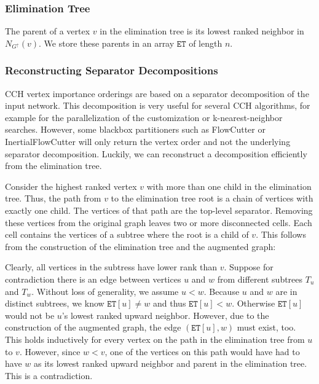 \documentclass[a4paper, english, cleveref]{lipics-v2021}
\newcommand*{\gchu}{G^{\uparrow}}
\begin{document}
\subsubsection{Elimination Tree}

The parent of a vertex $v$ in the elimination tree is its lowest ranked neighbor in $N_{\gchu}(v)$.
We store these parents in an array $\mathtt{ET}$ of length $n$.

\subsubsection{Reconstructing Separator Decompositions}
\label{sec:reconstruct_sep_tree}

CCH vertex importance orderings are based on a separator decomposition of the input network.
This decomposition is very useful for several CCH algorithms, for example for the parallelization of the customization or k-nearest-neighbor searches.
However, some blackbox partitioners such as FlowCutter or InertialFlowCutter will only return the vertex order and not the underlying separator decomposition.
Luckily, we can reconstruct a decomposition efficiently from the elimination tree.

Consider the highest ranked vertex $v$ with more than one child in the elimination tree.
Thus, the path from $v$ to the elimination tree root is a chain of vertices with exactly one child.
The vertices of that path are the top-level separator.
Removing these vertices from the original graph leaves two or more disconnected cells.
Each cell contains the vertices of a subtree where the root is a child of $v$.
This follows from the construction of the elimination tree and the augmented graph:

Clearly, all vertices in the subtress have lower rank than $v$.
Suppose for contradiction there is an edge between vertices $u$ and $w$ from different subtrees $T_u$ and $T_w$.
Without loss of generality, we assume $u < w$.
Because $u$ and $w$ are in distinct subtrees, we know $\mathtt{ET}[u] \neq w$ and thus $\mathtt{ET}[u] < w$.
Otherwise $\mathtt{ET}[u]$ would not be $u$'s lowest ranked upward neighbor.
However, due to the construction of the augmented graph, the edge $(\mathtt{ET}[u], w)$ must exist, too.
This holds inductively for every vertex on the path in the elimination tree from $u$ to $v$.
However, since $w < v$, one of the vertices on this path would have had to have $w$ as its lowest ranked upward neighbor and parent in the elimination tree.
This is a contradiction.
\end{document}
